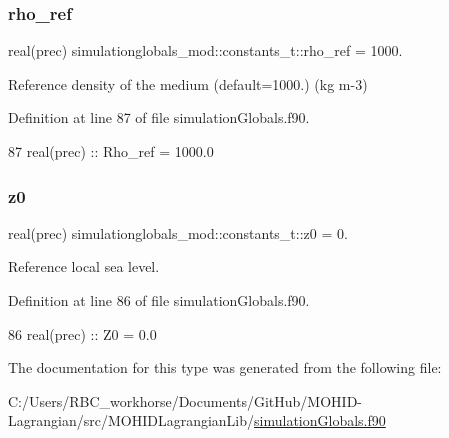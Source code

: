 \subsubsection{\texorpdfstring{rho\+\_\+ref}{rho\_ref}}
{\footnotesize\ttfamily real(prec) simulationglobals\+\_\+mod\+::constants\+\_\+t\+::rho\+\_\+ref = 1000.\hspace{0.3cm}{\ttfamily [private]}}



Reference density of the medium (default=1000.) (kg m-\/3) 



Definition at line 87 of file simulation\+Globals.\+f90.


\begin{DoxyCode}
87         \textcolor{keywordtype}{real(prec)}   :: Rho\_ref = 1000.0
\end{DoxyCode}
\mbox{\label{structsimulationglobals__mod_1_1constants__t_a9dab4143c1d5fd54c8337d78ea9b7d82}} 
\subsubsection{\texorpdfstring{z0}{z0}}
{\footnotesize\ttfamily real(prec) simulationglobals\+\_\+mod\+::constants\+\_\+t\+::z0 = 0.\hspace{0.3cm}{\ttfamily [private]}}



Reference local sea level. 



Definition at line 86 of file simulation\+Globals.\+f90.


\begin{DoxyCode}
86         \textcolor{keywordtype}{real(prec)}   :: Z0 = 0.0
\end{DoxyCode}


The documentation for this type was generated from the following file\+:\begin{DoxyCompactItemize}
\item 
C\+:/\+Users/\+R\+B\+C\+\_\+workhorse/\+Documents/\+Git\+Hub/\+M\+O\+H\+I\+D-\/\+Lagrangian/src/\+M\+O\+H\+I\+D\+Lagrangian\+Lib/\mbox{\hyperlink{simulation_globals_8f90}{simulation\+Globals.\+f90}}\end{DoxyCompactItemize}
